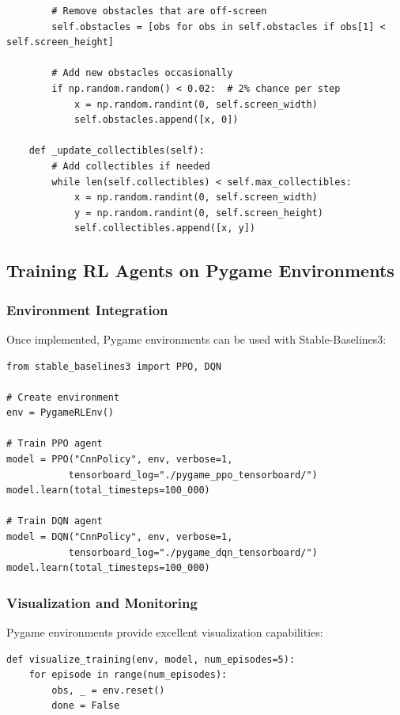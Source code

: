 \documentclass[12pt]{article}
\begin{document}
{{{\begin{verbatim}
        # Remove obstacles that are off-screen
        self.obstacles = [obs for obs in self.obstacles if obs[1] < self.screen_height]
        
        # Add new obstacles occasionally
        if np.random.random() < 0.02:  # 2% chance per step
            x = np.random.randint(0, self.screen_width)
            self.obstacles.append([x, 0])
            
    def _update_collectibles(self):
        # Add collectibles if needed
        while len(self.collectibles) < self.max_collectibles:
            x = np.random.randint(0, self.screen_width)
            y = np.random.randint(0, self.screen_height)
            self.collectibles.append([x, y])
\end{verbatim}

\subsection{Training RL Agents on Pygame Environments}

\subsubsection{Environment Integration}

Once implemented, Pygame environments can be used with Stable-Baselines3:

\begin{verbatim}
from stable_baselines3 import PPO, DQN

# Create environment
env = PygameRLEnv()

# Train PPO agent
model = PPO("CnnPolicy", env, verbose=1, 
           tensorboard_log="./pygame_ppo_tensorboard/")
model.learn(total_timesteps=100_000)

# Train DQN agent
model = DQN("CnnPolicy", env, verbose=1, 
           tensorboard_log="./pygame_dqn_tensorboard/")
model.learn(total_timesteps=100_000)
\end{verbatim}

\subsubsection{Visualization and Monitoring}

Pygame environments provide excellent visualization capabilities:

\begin{verbatim}
def visualize_training(env, model, num_episodes=5):
    for episode in range(num_episodes):
        obs, _ = env.reset()
        done = False
        

\end{verbatim}}}}
\end{document}
